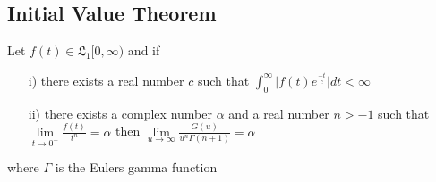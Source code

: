  \subsection{Initial Value Theorem}
 \begin{theorem}
  Let $ f(t)\in \mathfrak{L}_{1}[0,\infty) $ and if
\begin{enumerate}
\item[i)]there exists a real number $c$ such that $\int_{0}^{\infty}\vert f(t)e^{\frac{-t}{c}}\vert dt < \infty $
\item[ii)]there exists a complex number $\alpha$ and a real number $n>-1$ such that\\
$\underset{t\rightarrow 0^{+}}\lim \frac{f(t)}{t^{n}}=\alpha$ then
$\underset{u\rightarrow \infty}\lim \frac{G(u)}{u^{n}\Gamma(n+1)}=\alpha$
\end{enumerate}
where $\Gamma$ is the Eulers gamma function
\end{theorem}
